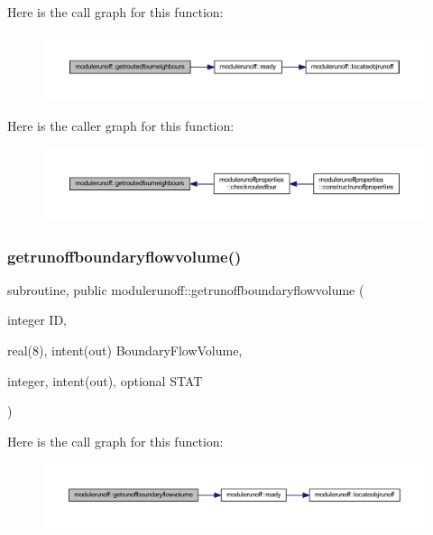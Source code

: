 Here is the call graph for this function\+:
\nopagebreak
\begin{figure}[H]
\begin{center}
\leavevmode
\includegraphics[width=350pt]{namespacemodulerunoff_a012d41440fbbe25a6de0417a150502fd_cgraph}
\end{center}
\end{figure}
Here is the caller graph for this function\+:
\nopagebreak
\begin{figure}[H]
\begin{center}
\leavevmode
\includegraphics[width=350pt]{namespacemodulerunoff_a012d41440fbbe25a6de0417a150502fd_icgraph}
\end{center}
\end{figure}
\mbox{\label{namespacemodulerunoff_a3a9224ad169d37f7fdb8eb535513d1b1}} 
\subsubsection{\texorpdfstring{getrunoffboundaryflowvolume()}{getrunoffboundaryflowvolume()}}
{\footnotesize\ttfamily subroutine, public modulerunoff\+::getrunoffboundaryflowvolume (\begin{DoxyParamCaption}\item[{integer}]{ID,  }\item[{real(8), intent(out)}]{Boundary\+Flow\+Volume,  }\item[{integer, intent(out), optional}]{S\+T\+AT }\end{DoxyParamCaption})}

Here is the call graph for this function\+:
\nopagebreak
\begin{figure}[H]
\begin{center}
\leavevmode
\includegraphics[width=350pt]{namespacemodulerunoff_a3a9224ad169d37f7fdb8eb535513d1b1_cgraph}
\end{center}
\end{figure}
\mbox{\label{namespacemodulerunoff_af29a57ef10a724fc9c8e0a4f1f22339e}} 
